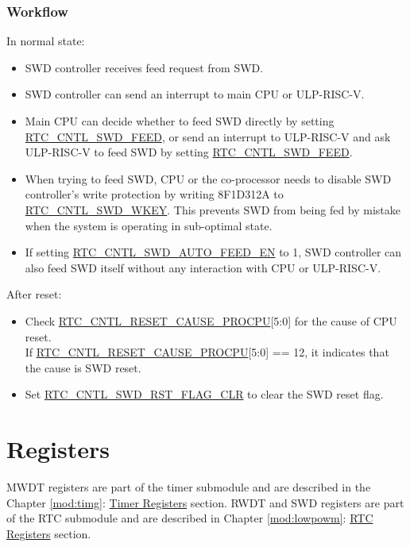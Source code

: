 \documentclass[main\_\_EN.tex]{subfiles}
\begin{document}
\subsubsection{Workflow}
In normal state:
\begin{itemize}
    \item SWD controller receives feed request from SWD.
    \item SWD controller can send an interrupt to main CPU or ULP-RISC-V.
    \item Main CPU can decide whether to feed SWD directly by setting \hyperref[fielddesc:RTCCNTLSWDFEED]{RTC\_CNTL\_SWD\_FEED}, or send an interrupt to ULP-RISC-V and ask ULP-RISC-V to feed SWD by setting \hyperref[fielddesc:RTCCNTLSWDFEED]{RTC\_CNTL\_SWD\_FEED}.
    \item When trying to feed SWD, CPU or the co-processor needs to disable SWD controller’s write protection by writing \hexprefix{}8F1D312A to \hyperref[fielddesc:RTCCNTLSWDWKEY]{RTC\_CNTL\_SWD\_WKEY}. This prevents SWD from being fed by mistake when the system is operating in sub-optimal state.
    \item If setting \hyperref[fielddesc:RTCCNTLSWDAUTOFEEDEN]{RTC\_CNTL\_SWD\_AUTO\_FEED\_EN} to 1, SWD controller can also feed SWD itself without any interaction with CPU or ULP-RISC-V.
\end{itemize}

After reset:
\begin{itemize}
    \item Check \hyperref[fielddesc:RTCCNTLRESETCAUSEPROCPU]{RTC\_CNTL\_RESET\_CAUSE\_PROCPU}[5:0] for the cause of CPU reset.\\
	If \hyperref[fielddesc:RTCCNTLRESETCAUSEPROCPU]{RTC\_CNTL\_RESET\_CAUSE\_PROCPU}[5:0] == \hexprefix{}12, it indicates that the cause is SWD reset.
	\item Set \hyperref[fielddesc:RTCCNTLSWDRSTFLAGCLR]{RTC\_CNTL\_SWD\_RST\_FLAG\_CLR} to clear the SWD reset flag.
\end{itemize}

\hypertarget{wdt-reg-summ}{}
\section{Registers}

MWDT registers are part of the timer submodule and are described in the Chapter \ref{mod:timg}: \textit{} \hyperref[timer_registers]{Timer Registers} section. RWDT and SWD registers are part of the RTC submodule and are described in Chapter \ref{mod:lowpowm}: \textit{} \hyperref[RTC_Register]{RTC Registers} section.
\end{document}
